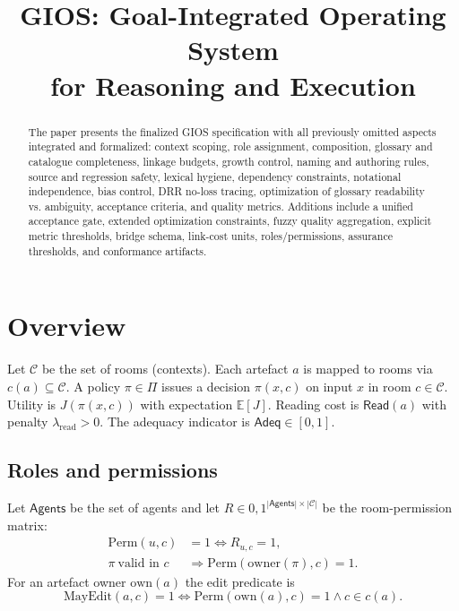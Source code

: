 \documentclass[conference]{IEEEtran}
\title{GIOS: Goal-Integrated Operating System\\ for Reasoning and Execution}
\author{\IEEEauthorblockN{Mikhail Nazarenko}
\IEEEauthorblockA{
Email: mikhail.nazarenko@gmail.com}
}
\begin{document}
\maketitle

\begin{abstract}
The paper presents the finalized GIOS specification with all previously omitted aspects integrated and formalized: context scoping, role assignment, composition, glossary and catalogue completeness, linkage budgets, growth control, naming and authoring rules, source and regression safety, lexical hygiene, dependency constraints, notational independence, bias control, DRR no-loss tracing, optimization of glossary readability vs. ambiguity, acceptance criteria, and quality metrics. Additions include a unified acceptance gate, extended optimization constraints, fuzzy quality aggregation, explicit metric thresholds, bridge schema, link-cost units, roles/permissions, assurance thresholds, and conformance artifacts.
\end{abstract}

\section{Overview}
Let $\mathcal{C}$ be the set of rooms (contexts). Each artefact $a$ is mapped to rooms via
$c(a)\subseteq \mathcal{C}$. A policy $\pi\in\Pi$ issues a decision $\pi(x,c)$ on input $x$ in room
$c\in\mathcal{C}$. Utility is $J(\pi(x,c))$ with expectation $\mathbb{E}[J]$. Reading cost is
$\mathsf{Read}(a)$ with penalty $\lambda_{\mathrm{read}}>0$. The adequacy indicator is
$\mathsf{Adeq}\in[0,1]$.

\subsection{Roles and permissions}
Let $\mathsf{Agents}$ be the set of agents and let $R\in{0,1}^{|\mathsf{Agents}|\times|\mathcal{C}|}$ be the room-permission matrix:
\begin{equation}
\label{eq:roles-perm}
\begin{aligned}
\mathrm{Perm}(u,c)&=1\iff R_{u,c}=1,\\
\pi\ \text{valid in }c&\Rightarrow \mathrm{Perm}(\mathrm{owner}(\pi),c)=1.
\end{aligned}
\end{equation}
For an artefact owner $\mathrm{own}(a)$ the edit predicate is
\begin{equation}
\label{eq:roles-edit}
\mathrm{MayEdit}(a,c)=1\iff \mathrm{Perm}(\mathrm{own}(a),c)=1\wedge c\in c(a).
\end{equation}
\end{document}
